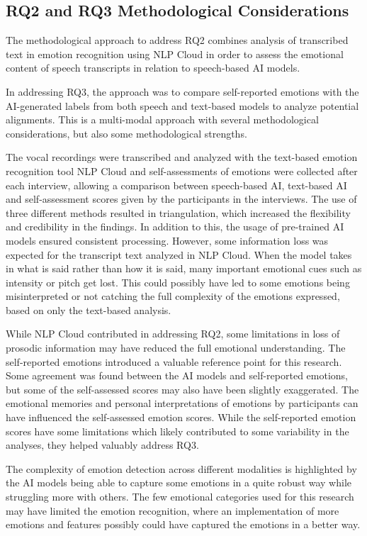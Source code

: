 \subsection{RQ2 and RQ3 Methodological Considerations}
The methodological approach to address RQ2 combines analysis of transcribed text in emotion recognition using NLP Cloud in order to assess the emotional content of speech transcripts in relation to speech-based AI models.

In addressing RQ3, the approach was to compare self-reported emotions with the AI-generated labels from both speech and text-based models to analyze potential alignments.
This is a multi-modal approach with several methodological considerations, but also some methodological strengths.

The vocal recordings were transcribed and analyzed with the text-based emotion recognition tool NLP Cloud and self-assessments of emotions were collected after each interview, allowing a comparison between speech-based AI, text-based AI and self-assessment scores given by the participants in the interviews. 
The use of three different methods resulted in triangulation, which increased the flexibility and credibility in the findings. In addition to this, the usage of pre-trained AI models ensured consistent processing. However, some information loss was expected for the transcript text analyzed in NLP Cloud. When the model takes in what is said rather than how it is said, many important emotional cues such as intensity or pitch get lost. This could possibly have led to some emotions being misinterpreted or not catching the full complexity of the emotions expressed, based on only the text-based analysis.

While NLP Cloud contributed in addressing RQ2, some limitations in loss of prosodic information may have reduced the full emotional understanding.
The self-reported emotions introduced a valuable reference point for this research. Some agreement was found between the AI models and self-reported emotions, but some of the self-assessed scores may also have been slightly exaggerated. The emotional memories and personal interpretations of emotions by participants can have influenced the self-assessed emotion scores.
While the self-reported emotion scores have some limitations which likely contributed to some variability in the analyses, they helped valuably address RQ3.

The complexity of emotion detection across different modalities is highlighted by the AI models being able to capture some emotions in a quite robust way while struggling more with others. The few emotional categories used for this research may have limited the emotion recognition, where an implementation of more emotions and features possibly could have captured the emotions in a better way.

